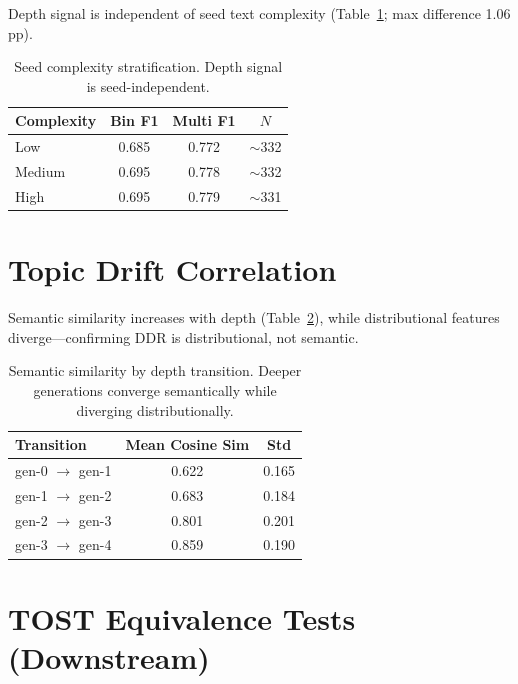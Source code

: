 \documentclass[11pt,a4paper]{article}
\begin{document}
Depth signal is independent of seed text complexity (Table~\ref{tab:seed_complex}; max difference 1.06 pp).

\begin{table}[h]
\centering
\small
\begin{tabular}{lccc}
\toprule
\textbf{Complexity} & \textbf{Bin F1} & \textbf{Multi F1} & \textbf{$N$} \\
\midrule
Low & 0.685 & 0.772 & $\sim$332 \\
Medium & 0.695 & 0.778 & $\sim$332 \\
High & 0.695 & 0.779 & $\sim$331 \\
\bottomrule
\end{tabular}
\caption{Seed complexity stratification. Depth signal is seed-independent.}
\label{tab:seed_complex}
\end{table}

\section{Topic Drift Correlation}
\label{app:topic}

Semantic similarity increases with depth (Table~\ref{tab:topic}), while distributional features diverge---confirming DDR is distributional, not semantic.

\begin{table}[h]
\centering
\small
\begin{tabular}{lcc}
\toprule
\textbf{Transition} & \textbf{Mean Cosine Sim} & \textbf{Std} \\
\midrule
gen-0 $\to$ gen-1 & 0.622 & 0.165 \\
gen-1 $\to$ gen-2 & 0.683 & 0.184 \\
gen-2 $\to$ gen-3 & 0.801 & 0.201 \\
gen-3 $\to$ gen-4 & 0.859 & 0.190 \\
\bottomrule
\end{tabular}
\caption{Semantic similarity by depth transition. Deeper generations converge semantically while diverging distributionally.}
\label{tab:topic}
\end{table}

\section{TOST Equivalence Tests (Downstream)}
\label{app:tost_downstream}
\end{document}
